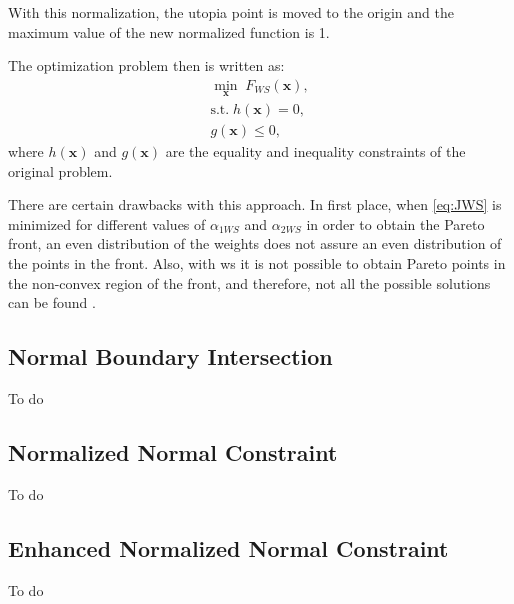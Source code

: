 With this normalization, the utopia point is moved to the origin and the maximum value of the new normalized function is 1.

The optimization problem then is written as:
\begin{equation}
\begin{gathered}
\min_{\mathbf{x}}{\; F_{WS}(\mathbf{x})}, \\
\text{s.t.} \; h(\mathbf{x})=0, \\
g(\mathbf{x}) \leq 0,
\end{gathered}
\label{eq:WSProblem}
\end{equation}
%
where $h(\mathbf{x})$ and $g(\mathbf{x})$ are the equality and inequality constraints of the original problem.

There are certain drawbacks with this approach. In first place, when \eqref{eq:JWS} is minimized for different values of $\alpha_{1WS}$ and $\alpha_{2WS}$ in order to obtain the Pareto front, an even distribution of the weights does not assure an even distribution of the points in the front. Also, with \gls{ws} it is not possible to obtain Pareto points in the non-convex region of the front, and therefore, not all the possible solutions can be found \cite{Das1997}. %
\subsection{Normal Boundary Intersection}
\label{sec:NBI}
To do
\subsection{Normalized Normal Constraint}
\label{sec:NNC}
To do
\subsection{Enhanced Normalized Normal Constraint}
\label{sec:ENNC}
To do
